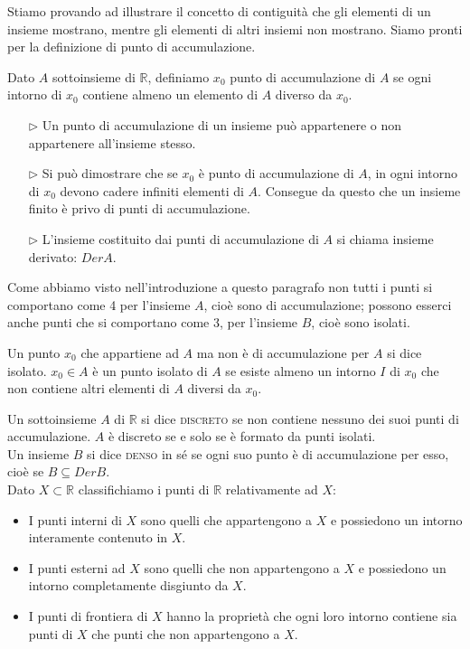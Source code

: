 Stiamo provando ad illustrare il concetto di contiguità che gli elementi di 
un insieme mostrano, mentre gli elementi di altri insiemi non mostrano. Siamo 
pronti per la definizione di punto di accumulazione.\\

\begin{definizione}
  Dato $A$ sottoinsieme di $\mathbb{R}$, definiamo $x_0$ punto di 
accumulazione di $A$ se ogni intorno di $x_0$ contiene almeno un elemento di 
$A$ diverso da $x_0$.
\begin{itemize}
  \item[$\rhd$] Un punto di accumulazione di un insieme può appartenere 
o non appartenere all'insieme stesso.
  \item[$\rhd$]   Si può dimostrare che se $x_0$ è punto di 
accumulazione di $A$, in ogni intorno di $x_0$ devono cadere infiniti 
elementi di $A$. Consegue da questo che un insieme finito è privo di punti di 
accumulazione.
  \item[$\rhd$] L'insieme costituito dai punti di accumulazione di $A$ 
si chiama insieme derivato: $Der A$.
\end{itemize}
\end{definizione}

Come abbiamo visto nell'introduzione a questo paragrafo non tutti i punti si 
comportano come 4 per l'insieme $A$, cioè sono di accumulazione; possono 
esserci anche punti che si comportano come 3, per l'insieme $B$, cioè sono 
isolati.\\

\begin{definizione}
  Un punto $x_0$ che appartiene ad $A$ ma non è di accumulazione per $A$ 
si dice isolato. $x_0\in A$ è un punto isolato di $A$ se esiste almeno un 
intorno $I$ di $x_0$ che non contiene altri elementi di $A$ diversi da 
$x_0$.\\
\end{definizione}

Un sottoinsieme $A$ di $\mathbb{R}$ si dice \textsc{discreto} se non contiene 
nessuno dei suoi punti di accumulazione. $A$ è discreto se e solo se è 
formato da punti isolati.\\
Un insieme $B$ si dice \textsc{denso} in sé se ogni suo punto è di 
accumulazione per esso, cioè se $B\subseteq Der B$.\\

Dato $X\subset \mathbb{R}$ classifichiamo i punti di $\mathbb{R}$ 
relativamente ad $X$:
\begin{itemize}
  \item I punti interni di $X$ sono quelli che appartengono a $X$ e 
possiedono un intorno interamente contenuto in $X$.
  \item   I punti esterni ad $X$ sono quelli che non appartengono a $X$ 
e possiedono un intorno completamente disgiunto da $X$.
  \item   I punti di frontiera di $X$ hanno la proprietà che ogni loro 
intorno contiene sia punti di $X$ che punti che non appartengono a $X$.
\end{itemize}

